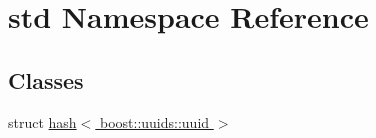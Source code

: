 \hypertarget{namespacestd}{}\section{std Namespace Reference}
\label{namespacestd}
\subsection*{Classes}
\begin{DoxyCompactItemize}
\item 
struct \hyperlink{structstd_1_1hash_3_01boost_1_1uuids_1_1uuid_01_4}{hash$<$ boost\+::uuids\+::uuid $>$}
\end{DoxyCompactItemize}
